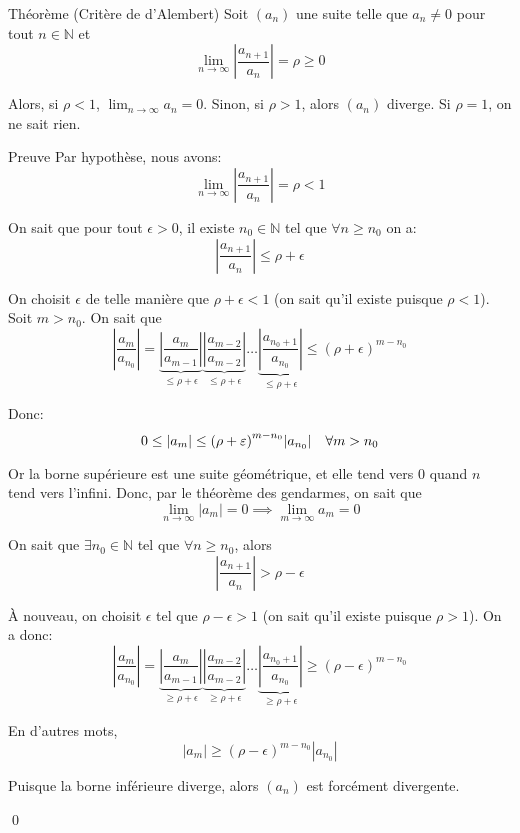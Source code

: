 \documentclass[a4paper]{article}
\begin{document}
\begin{parag}{Théorème (Critère de d'Alembert)}
    Soit $\left(a_n\right)$ une suite telle que $a_n \neq 0$ pour tout $n \in \mathbb{N}$ et 
    \[\lim_{n \to \infty} \left|\frac{a_{n+1}}{a_n}\right| = \rho \geq 0\]
    
    Alors, si $\rho < 1$, $\lim_{n \to \infty} a_n = 0$. Sinon, si $\rho > 1$, alors $\left(a_n\right)$ diverge. Si $\rho = 1$, on ne sait rien.

    \begin{subparag}{Preuve}
         Par hypothèse, nous avons:
        \[\lim_{n \to \infty} \left|\frac{a_{n+1}}{a_n}\right| = \rho < 1\]
        
        On sait que pour tout $\epsilon > 0$, il existe $n_0 \in \mathbb{N}$ tel que $\forall n \geq n_0$ on a:
        \[\left|\frac{a_{n+1}}{a_n}\right| \leq \rho + \epsilon\]
        
        On choisit $\epsilon$ de telle manière que $\rho + \epsilon < 1$ (on sait qu'il existe puisque $\rho < 1$). Soit $m > n_0$. On sait que 
        \[\left|\frac{a_m}{a_{n_0}}\right| = \underbrace{\left|\frac{a_m}{a_{m-1}}\right|}_{\leq \rho + \epsilon}\underbrace{\left|\frac{a_{m-2}}{a_{m-2}}\right|}_{\leq \rho + \epsilon}\ldots\underbrace{\left|\frac{a_{n_0 + 1}}{a_{n_0}}\right|}_{\leq \rho + \epsilon} \leq \left(\rho + \epsilon\right)^{m - n_0}\]
        
        Donc: 
        \[0 \leq \left|a_m\right| \leq \left(\rho + \epsilon\right)^{m - n_0} \left|a_{n_0}\right| \mathspace \forall m > n_0\]
        
        Or la borne supérieure est une suite géométrique, et elle tend vers 0 quand $n$ tend vers l'infini. Donc, par le théorème des gendarmes, on sait que 
        \[\lim_{n \to \infty} \left|a_m\right| = 0 \implies \lim_{m \to \infty} a_m = 0\]
        
        \vspace{1em}

         On sait que $\exists n_0 \in \mathbb{N}$ tel que $\forall n \geq n_0$, alors 
        \[\left|\frac{a_{n+1}}{a_n}\right| > \rho - \epsilon\]

        À nouveau, on choisit $\epsilon$ tel que $\rho - \epsilon > 1$ (on sait qu'il existe puisque $\rho > 1$). On a donc: 
        \[\left|\frac{a_m}{a_{n_0}}\right| = \underbrace{\left|\frac{a_m}{a_{m-1}}\right|}_{\geq \rho + \epsilon}\underbrace{\left|\frac{a_{m-2}}{a_{m-2}}\right|}_{\geq \rho + \epsilon}\ldots\underbrace{\left|\frac{a_{n_0 + 1}}{a_{n_0}}\right|}_{\geq \rho + \epsilon} \geq \left(\rho - \epsilon\right)^{m - n_0}\]
        
        En d'autres mots, 
        \[\left|a_m\right| \geq \left(\rho - \epsilon\right)^{m - n_0} \left|a_{n_0}\right|\]
        
        Puisque la borne inférieure diverge, alors $\left(a_n\right)$ est forcément divergente.

        \qed
    \end{subparag}
\end{parag}
\end{document}
